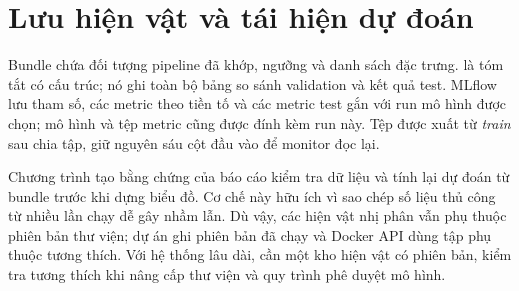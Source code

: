 \section{Lưu hiện vật và tái hiện dự đoán}
Bundle  chứa đối tượng pipeline đã khớp, ngưỡng và danh sách đặc trưng.  là tóm tắt có cấu trúc; nó ghi toàn bộ bảng so sánh validation và kết quả test. MLflow lưu tham số, các metric theo tiền tố  và các metric test gắn với run mô hình được chọn; mô hình và tệp metric cũng được đính kèm run này. Tệp  được xuất từ \emph{train} sau chia tập, giữ nguyên sáu cột đầu vào để monitor đọc lại.

Chương trình tạo bằng chứng của báo cáo kiểm tra dữ liệu và tính lại dự đoán từ bundle trước khi dựng biểu đồ. Cơ chế này hữu ích vì sao chép số liệu thủ công từ nhiều lần chạy dễ gây nhầm lẫn. Dù vậy, các hiện vật nhị phân vẫn phụ thuộc phiên bản thư viện; dự án ghi phiên bản đã chạy và Docker API dùng tập phụ thuộc tương thích. Với hệ thống lâu dài, cần một kho hiện vật có phiên bản, kiểm tra tương thích khi nâng cấp thư viện và quy trình phê duyệt mô hình.

